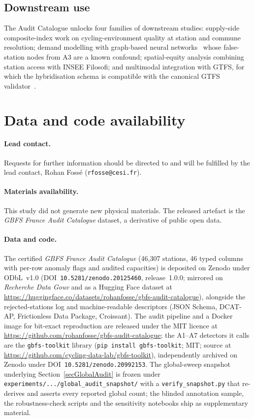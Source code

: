 \documentclass[11pt,a4paper]{article}
\newif\ifanonymous
\newcommand{\zdoi}{\ifanonymous\texttt{[deposited on Zenodo; DOI withheld for review]}\else\texttt{10.5281/zenodo.20125460}\fi}
\newcommand{\codeurl}{\ifanonymous\texttt{[anonymised repository; link provided on acceptance]}\else\url{https://github.com/rohanfosse/gbfs-audit-catalogue}\fi}
\newcommand{\hfurl}{\ifanonymous\texttt{[anonymised dataset mirror]}\else\url{https://huggingface.co/datasets/rohanfosse/gbfs-audit-catalogue}\fi}
\newcommand{\toolkitdoi}{\ifanonymous\texttt{[reference-implementation library archived on Zenodo; DOI withheld for review]}\else\texttt{10.5281/zenodo.20992153}\fi}
\newcommand{\toolkiturl}{\ifanonymous\texttt{[anonymised library repository; link provided on acceptance]}\else\url{https://github.com/cycling-data-lab/gbfs-toolkit}\fi}
\begin{document}

\subsection{Downstream use}
The Audit Catalogue unlocks four families of downstream studies:
supply-side composite-index work on cycling-environment quality at
station and commune resolution; demand modelling with graph-based
neural networks~\cite{Lin2018BSSGraph} whose false-station nodes
from A3 are a known confound; spatial-equity analysis combining
station access with INSEE Filosofi; and multimodal integration with
GTFS, for which the hybridisation schema is compatible with the
canonical GTFS validator~\cite{MobilityData2024Validator}.


\section*{Data and code availability}

\paragraph{Lead contact.} \ifanonymous Author contact details are
withheld for double-blind review.\else Requests for further information
should be directed to and will be fulfilled by the lead contact, Rohan
Foss\'e (\texttt{rfosse@cesi.fr}).\fi

\paragraph{Materials availability.} This study did not generate new
physical materials. The released artefact is the
\emph{GBFS France Audit Catalogue} dataset, a derivative of public open
data.

\paragraph{Data and code.}
The certified \emph{GBFS France Audit Catalogue} (46{,}307 stations,
46 typed columns with per-row anomaly flags and audited capacities) is
deposited on Zenodo under ODbL~v1.0
(DOI~\zdoi, release~1.0.0; mirrored on
\emph{Recherche Data Gouv} and as a Hugging Face dataset at
\hfurl),
alongside the rejected-stations log and machine-readable descriptors
(JSON Schema, DCAT-AP, Frictionless Data Package, Croissant). The audit
pipeline and a Docker image for bit-exact reproduction are released under
the MIT licence at \codeurl; the A1--A7 detectors it calls are the
\texttt{gbfs-toolkit} library (\texttt{pip install gbfs-toolkit}; MIT;
source at \toolkiturl), independently archived on Zenodo under
DOI~\toolkitdoi. The global-sweep
snapshot underlying Section~\ref{secGlobalAudit} is frozen under
\texttt{experiments/.../global\_audit\_snapshot/} with a
\texttt{verify\_snapshot.py} that re-derives and asserts every reported
global count; the blinded annotation sample, the robustness-check scripts
and the sensitivity notebooks ship as supplementary material.
\end{document}
